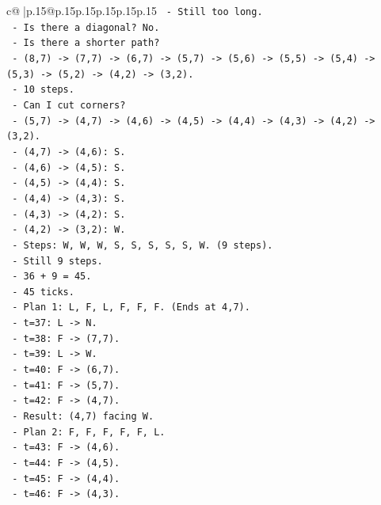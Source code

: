 \documentclass{article}
\begin{document}
{\begin{supertabular}{c@{$\;$}|p{.15\linewidth}@{}p{.15\linewidth}p{.15\linewidth}p{.15\linewidth}p{.15\linewidth}p{.15\linewidth}}
{{{\texttt{    {-} Still too long.} \\
\texttt{    {-} Is there a diagonal? No.} \\
\texttt{    {-} Is there a shorter path?} \\
\texttt{    {-} (8,7) {-}> (7,7) {-}> (6,7) {-}> (5,7) {-}> (5,6) {-}> (5,5) {-}> (5,4) {-}> (5,3) {-}> (5,2) {-}> (4,2) {-}> (3,2).} \\
\texttt{    {-} 10 steps.} \\
\texttt{    {-} Can I cut corners?} \\
\texttt{    {-} (5,7) {-}> (4,7) {-}> (4,6) {-}> (4,5) {-}> (4,4) {-}> (4,3) {-}> (4,2) {-}> (3,2).} \\
\texttt{    {-} (4,7) {-}> (4,6): S.} \\
\texttt{    {-} (4,6) {-}> (4,5): S.} \\
\texttt{    {-} (4,5) {-}> (4,4): S.} \\
\texttt{    {-} (4,4) {-}> (4,3): S.} \\
\texttt{    {-} (4,3) {-}> (4,2): S.} \\
\texttt{    {-} (4,2) {-}> (3,2): W.} \\
\texttt{    {-} Steps: W, W, W, S, S, S, S, S, W. (9 steps).} \\
\texttt{    {-} Still 9 steps.} \\
\texttt{    {-} 36 + 9 = 45.} \\
\texttt{    {-} 45 ticks.} \\
\texttt{    {-} Plan 1: L, F, L, F, F, F. (Ends at 4,7).} \\
\texttt{      {-} t=37: L {-}> N.} \\
\texttt{      {-} t=38: F {-}> (7,7).} \\
\texttt{      {-} t=39: L {-}> W.} \\
\texttt{      {-} t=40: F {-}> (6,7).} \\
\texttt{      {-} t=41: F {-}> (5,7).} \\
\texttt{      {-} t=42: F {-}> (4,7).} \\
\texttt{      {-} Result: (4,7) facing W.} \\
\texttt{    {-} Plan 2: F, F, F, F, F, L.} \\
\texttt{      {-} t=43: F {-}> (4,6).} \\
\texttt{      {-} t=44: F {-}> (4,5).} \\
\texttt{      {-} t=45: F {-}> (4,4).} \\
\texttt{      {-} t=46: F {-}> (4,3).} \\
}}}
\end{supertabular}}
\end{document}
